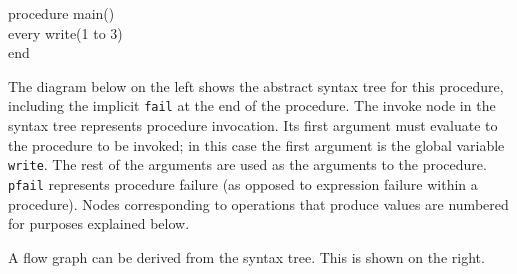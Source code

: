\goodbreak
\begin{iconcode}
procedure main()\\
\>every write(1 to 3)\\
end\\
\end{iconcode}

\noindent
The diagram below on the left shows the abstract syntax tree for this
procedure, including the implicit \texttt{fail} at the end of the
procedure. The invoke node in the syntax tree represents procedure
invocation. Its first argument must evaluate to the procedure to be
invoked; in this case the first argument is the global variable
\texttt{write}. The rest of the arguments are used as the arguments to the
procedure. \texttt{pfail} represents procedure failure (as opposed to
expression failure within a procedure). Nodes corresponding to
operations that produce values are numbered for purposes explained
below.

A flow graph can be derived from the syntax tree. This is shown on the right. 


